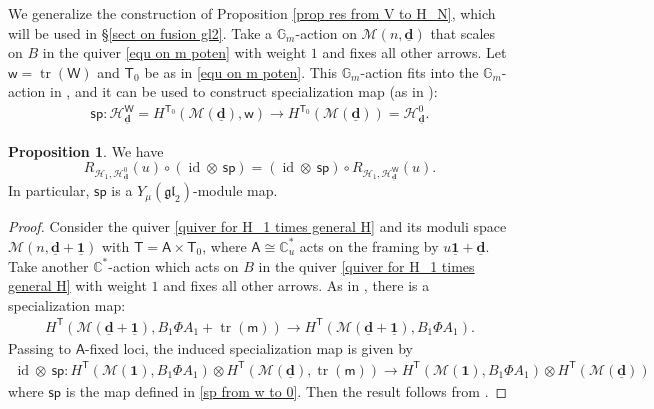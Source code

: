 \documentclass[10pt]{amsart}
\theoremstyle{definition}
\newtheorem{Proposition}[Theorem]{Proposition}
\numberwithin{equation}{section}
\newcommand{\bC}{\mathbb{C}}
\newcommand{\bG}{\mathbb{G}}
\newcommand{\bd}{\mathbf{d}}
\newcommand{\cM}{\mathcal{M}}
\newcommand{\sA}{\mathsf{A}}
\newcommand{\sT}{\mathsf{T}}
\newcommand{\sW}{\mathsf{W}}
\newcommand{\sw}{\mathsf{w}}
\newcommand{\tr}{\operatorname{tr}}
\newcommand{\id}{\operatorname{id}}
\begin{document}
We generalize the construction of Proposition \ref{prop res from V to H_N}, 
which will be used in \S \ref{sect on fusion gl2}.
Take a $\bG_m$-action on $\cM(n,\underline{\bd})$ that scales on $B$ in the quiver 
\eqref{equ on m poten} with weight $1$ and fixes all other arrows.  
Let $\sw=\tr(\sW)$ and $\sT_0$ be as in \eqref{equ on m poten}. This $\bG_m$-action fits into the $\bG_m$-action in \cite[Setting~7.1]{COZZ}, 
and it can be used to construct specialization map (as in \cite[Def.~7.14]{COZZ}):
\begin{align}\label{sp from w to 0}
    \mathsf{sp}\colon \mathcal H^{\sW}_{\underline{\bd}}=H^{\sT_0}(\cM(\underline{\bd}),\sw)\to H^{\sT_0}(\cM(\underline{\bd}))=\mathcal H^{0}_{\underline{\bd}}.
\end{align}

\begin{Proposition}\label{prop sp as mod map}
We have $$R_{\mathcal H_1,\mathcal H^{0}_{\underline{\bd}}}(u)\circ (\id\otimes\:\mathsf{sp})=(\id\otimes\:\mathsf{sp})\circ R_{\mathcal H_1,\mathcal H^{\sW}_{\underline{\bd}}}(u).$$ In particular, $\mathsf{sp}$ is a $Y_{\mu}(\mathfrak{gl}_2)$-module map.
\end{Proposition}

\begin{proof}
Consider the quiver \eqref{quiver for H_1 times general H} and its moduli space $\cM(n,\underline{\bd}+\underline{\mathbf 1})$ with $\sT=\sA\times \sT_0$, where 
$\sA\cong \bC^*_u$ acts on the framing by 
$u\underline{\mathbf 1}+\underline{\bd}$. 
Take another $\bC^*$-action which acts on $B$ in the quiver \eqref{quiver for H_1 times general H} with weight $1$ and fixes all other arrows. 
As in \cite[Def.~7.14]{COZZ}, there is a specialization map:
\begin{align*}
    H^\sT(\cM(\underline{\bd}+\underline{\mathbf 1}),B_1\Phi A_1+\tr(\mathsf m))\to H^\sT(\cM(\underline{\bd}+\underline{\mathbf 1}),B_1\Phi A_1).
\end{align*}
Passing to $\sA$-fixed loci, the induced specialization map is given by
\begin{align*}
    \id\otimes\:\mathsf{sp}\colon H^{\sT}(\cM(\mathbf 1),B_1\Phi A_1)\otimes H^{\sT}(\cM(\underline{\bd}),\tr(\mathsf m))\to H^{\sT}(\cM(\mathbf 1),B_1\Phi A_1)\otimes H^{\sT}(\cM(\underline{\bd}))
\end{align*}
where $\mathsf{sp}$ is the map defined in \eqref{sp from w to 0}. Then the result follows from 
\cite[Prop.~7.18]{COZZ}.
\end{proof}
\end{document}
